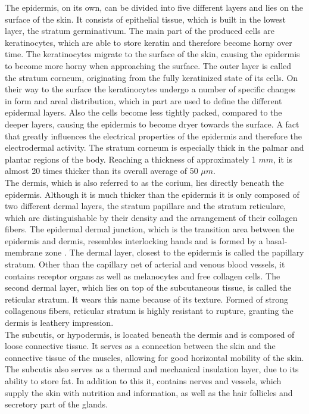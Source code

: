 The epidermis, on its own, can be divided into five different layers and lies on the surface of the skin. It consists of epithelial tissue, which is built in the lowest layer, the stratum germinativum. The main part of the produced cells are keratinocytes, which are able to store keratin and therefore become horny over time. The keratinocytes migrate to the surface of the skin, causing the epidermis to become more horny when approaching the surface. The outer layer is called the stratum corneum, originating from the fully keratinized state of its cells.
On their way to the surface the keratinocytes undergo a number of specific changes in form and areal  distribution, which in part are used to define the different epidermal layers. Also the cells become less tightly packed, compared to the deeper layers, causing the epidermis to become dryer towards the surface. A fact that greatly influences the electrical properties of the epidermis and therefore the  electrodermal activity. The stratum corneum is especially thick in the palmar and plantar regions of the body. Reaching a thickness of approximately 1 $mm$, it is almost 20 times thicker than its overall average of 50 $\mu m$.\\
The dermis, which is also referred to as the corium, lies directly beneath the epidermis. Although it is much thicker than the epidermis it is only composed of two different dermal layers, the stratum papillare and the stratum reticulare, which are distinguishable by their density and the arrangement of their collagen fibers. The epidermal dermal junction, which is the transition area between the epidermis and dermis, resembles interlocking hands and is formed by a basal-membrane zone \citep{boucsein2013electrodermal}.
The dermal layer, closest to the epidermis is called the papillary stratum. Other than the capillary net of arterial and venous blood vessels, it contains receptor organs as well as melanocytes and free collagen cells. The second dermal layer, which lies on top of the subcutaneous tissue, is called the reticular stratum. It wears this name because of its texture. Formed of strong collagenous fibers, reticular stratum is highly resistant to rupture, granting the dermis is leathery impression.\\

The subcutis, or hypodermis, is located beneath the dermis and is composed of loose connective tissue. It serves as a connection between the skin and the connective tissue of the muscles, allowing for good horizontal mobility of the skin. The subcutis also serves as a thermal and mechanical insulation layer, due to its ability to store fat. In addition to this it, contains nerves and vessels, which supply the skin with nutrition and information, as well as the hair follicles and secretory part of the glands.   

